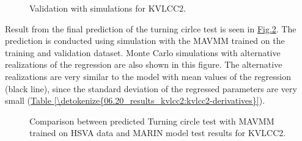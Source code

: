 \documentclass[review]{elsarticle}
\begin{document}
\begin{figure}[H]
\centering
\capstart

\noindent{}
\caption{Validation with simulations for KVLCC2.}\label{\detokenize{06.20_results_kvlcc2:fig-kvlcc2-validation-sim}}\end{figure}

\sphinxAtStartPar
Result from the final prediction of the turning cirlce test is seen in \hyperref[\detokenize{06.20_results_kvlcc2:fig-kvlcc2-testing-sim}]{Fig.\@ \ref{\detokenize{06.20_results_kvlcc2:fig-kvlcc2-testing-sim}}}. The prediction is conducted using simulation with the MAVMM trained on the training and validation dataset. Monte Carlo simulations with alternative realizations of the regression are also shown in this figure. The alternative realizations are very similar to the model with mean values of the regression (black line), since the standard deviation of the regressed parameters are very small (\hyperref[\detokenize{06.20_results_kvlcc2:kvlcc2-derivatives}]{Table \ref{\detokenize{06.20_results_kvlcc2:kvlcc2-derivatives}}}).

\begin{figure}[H]
\centering
\capstart

\noindent{}
\caption{Comparison between predicted Turning circle test with MAVMM trained on HSVA data and MARIN model test results for KVLCC2.}\label{\detokenize{06.20_results_kvlcc2:fig-kvlcc2-testing-sim}}\end{figure}
\end{document}

